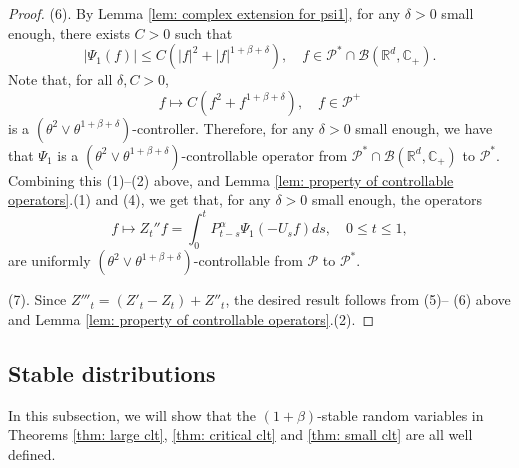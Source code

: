 \documentclass[12pt,a4paper]{amsart}
\theoremstyle{plain}
\theoremstyle{definition}
\numberwithin{equation}{section}
\begin{document}
\begin{proof}
    (6).  By  Lemma \ref{lem: complex extension for psi1}, for any $\delta > 0$ small enough, there exists  $C>0$ such that
\[
    |\Psi_1(f)|
    \le C(|f|^2+|f|^{1+\beta+ \delta}),
    \quad f\in \mathcal P^*\cap\mathcal B(\mathbb R^d, \mathbb C_+).
\]
        Note that, for all $\delta, C>0$,
\[
    f\mapsto C(f^2+f^{1+\beta+\delta}),
    \quad f\in \mathcal P^+
\]
        is a $(\theta^2 \vee \theta^{1+\beta+\delta})$-controller.
    Therefore, for any $\delta > 0$ small enough, we have that $\Psi_1$ is a $(\theta^2 \vee \theta^{1+\beta+\delta})$-controllable operator from $\mathcal P^*\cap\mathcal B(\mathbb R^d, \mathbb C_+)$ to $\mathcal P^*$.
        Combining  this  (1)--(2) above, and Lemma \ref{lem: property of controllable operators}.(1) and (4), we get that, for any $\delta > 0$ small enough, the operators
\[
    f
    \mapsto Z_t'' f
    = \int_0^t P_{t-s}^\alpha \Psi_1(-U_sf)ds,
    \quad 0\leq t\leq 1,
\]
    are uniformly $(\theta^2 \vee \theta^{1+\beta+\delta})$-controllable from $\mathcal P$ to $\mathcal P^*$.

    (7). Since $Z'''_t = (Z'_t-Z_t)+Z''_t$, the desired result follows from (5)-- (6) above and Lemma \ref{lem: property of controllable operators}.(2).
\end{proof}


\subsection{Stable distributions}
\label{sec: stable distributions}

    In this subsection, we will show that the $(1+\beta)$-stable random variables in Theorems \ref{thm: large clt}, \ref{thm: critical clt} and \ref{thm: small clt} are all well defined.
\end{document}
